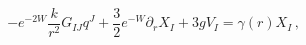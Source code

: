 \begin{equation}
- e^{-2W} \frac{k}{r^2} G_{IJ} q^J + \frac 32 e^{-W} \partial_r X_I +
3gV_I = \gamma(r) X_I\,, \label{eqgamma}
\end{equation}

